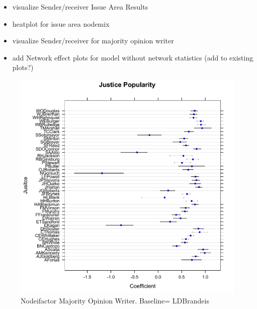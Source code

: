 \documentclass[headsepline=true, abstracton]{scrartcl}
\begin{document}
\begin{itemize}
\item visualize Sender/receiver Issue Area Results
\item heatplot for issue area nodemix
\item visualize Sender/receiver for majority opinion writer
\item add Network effect plots for model without network statistics (add to existing plots?)
\end{itemize}


  
  \begin{figure}[H]
\includegraphics[width=15cm]{justice_popularity}
\caption{Nodeifactor Majority Opinion Writer. Baseline= LDBrandeis }
 \label{number_supporting}
\vspace{-.25cm}
\end{figure}  
\end{document}
